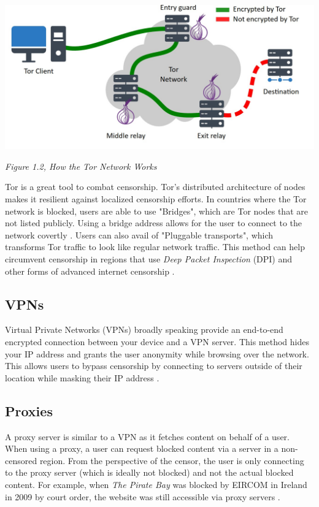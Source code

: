 \centerline{\includegraphics[width=480pt]{Griff/TCD SCSS CAPSTONE/Literature Review/How tor works.jpg}}

\centerline{\textit{Figure 1.2, How the Tor Network Works}}

Tor is a great tool to combat censorship. Tor's distributed architecture of nodes makes it resilient against localized censorship efforts. In countries where the Tor network is blocked, users are able to use "Bridges", which are Tor nodes that are not listed publicly. Using a bridge address allows for the user to connect to the network covertly \cite{torprojectBRIDGESProject}. Users can also avail of "Pluggable transports", which transforms Tor traffic to look like regular network traffic. This method can help circumvent censorship in regions that use \textit{Deep Packet Inspection} (DPI) and other forms of advanced internet censorship \cite{torprojectCIRCUMVENTIONProject}.

\subsection{VPNs}

Virtual Private Networks (VPNs) broadly speaking provide an end-to-end encrypted connection between your device and a VPN server. This method hides your IP address and grants the user anonymity while browsing over the network. This allows users to bypass censorship by connecting to servers outside of their location while masking their IP address \cite{TomsGuideVPN}.

\subsection{Proxies}

A proxy server is similar to a VPN as it fetches content on behalf of a user. When using a proxy, a user can request blocked content via a server in a non-censored region. From the perspective of the censor, the user is only connecting to the proxy server (which is ideally not blocked) and not the actual blocked content. For example, when \textit{The Pirate Bay} was blocked by EIRCOM in Ireland in 2009 by court order, the website was still accessible via proxy servers \cite{PirateBayBlocked2009}.

